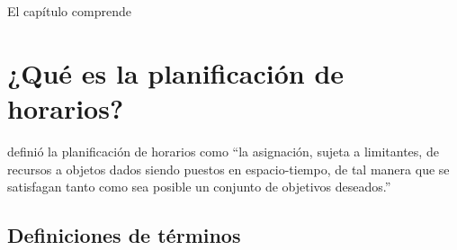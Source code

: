 \documentclass[draft,12pt,headsepline,footsepline,paper=letter]{scrreprt}
\begin{document}
El capítulo comprende 

\section{¿Qué es la planificación de horarios?}

\citet[p.~53]{wren95scheduling-timetabling} definió la planificación de horarios como “la asignación, sujeta a limitantes, de recursos a objetos dados siendo puestos en espacio-tiempo, de tal manera que se satisfagan tanto como sea posible un conjunto de objetivos deseados.”

\subsection{Definiciones de términos}
\end{document}
